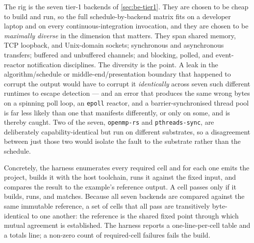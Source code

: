 The rig is the seven tier-1 backends of \cref{sec:be-tier1}. They are chosen to be
cheap to build and run, so the full schedule-by-backend matrix fits on a developer
laptop and on every continuous-integration invocation, and they are chosen to be
\emph{maximally diverse} in the dimension that matters. They span shared memory,
TCP loopback, and Unix-domain sockets; synchronous and asynchronous transfers;
buffered and unbuffered channels; and blocking, polled, and event-reactor
notification disciplines. The diversity is the point. A leak in the
algorithm/schedule or middle-end/presentation boundary that happened to corrupt
the output would have to corrupt it \emph{identically} across seven such different
runtimes to escape detection --- and an error that produces the same wrong bytes
on a spinning poll loop, an \texttt{epoll} reactor, and a barrier-synchronised
thread pool is far less likely than one that manifests differently, or only on
some, and is thereby caught. Two of the seven, \texttt{openmp-rs} and
\texttt{pthreads-sync}, are deliberately capability-identical but run on different
substrates, so a disagreement between just those two would isolate the fault to the
substrate rather than the schedule.

Concretely, the harness enumerates every required cell and for each one emits the
project, builds it with the host toolchain, runs it against the fixed input, and
compares the result to the example's reference output. A cell passes only if it
builds, runs, and matches.
Because all seven backends are compared against the same immutable reference, a set
of cells that all pass are transitively byte-identical to one another: the
reference is the shared fixed point through which mutual agreement is established.
The harness reports a one-line-per-cell table and a totals line; a non-zero count
of required-cell failures fails the build.

